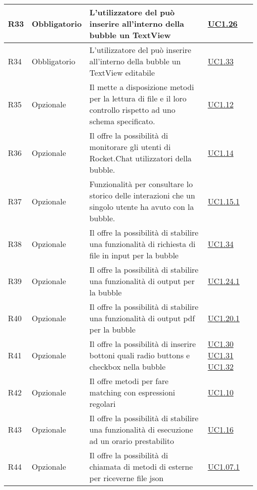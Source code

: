 \begin{longtable}{|P{1.5cm}|P{3cm}|P{6cm}|P{2.5cm}|}
	\hline R33 & Obbligatorio & L’utilizzatore del  può inserire all'interno della bubble un TextView & \hyperref[UC1.26]{UC1.26} \\
	\hline R34 & Obbligatorio & L’utilizzatore del  può inserire all'interno della bubble un TextView editabile & \hyperref[UC1.33]{UC1.33} \\
	\hline R35 & Opzionale & Il  mette a disposizione metodi per la lettura di file  e il loro controllo rispetto ad uno schema specificato. & \hyperref[UC1.12]{UC1.12} \\
	\hline R36 & Opzionale & Il  offre la possibilità di monitorare gli utenti di Rocket.Chat utilizzatori della bubble. & \hyperref[UC1.14]{UC1.14} \\
	\hline R37 & Opzionale & Funzionalità per consultare lo storico delle interazioni che un singolo utente ha avuto con la bubble. & \hyperref[UC1.15.1]{UC1.15.1} \\
	\hline R38 & Opzionale & Il  offre la possibilità di stabilire una funzionalità di richiesta di file in input per la bubble & \hyperref[UC1.34]{UC1.34} \\
	\hline R39 & Opzionale & Il  offre la possibilità di stabilire una funzionalità di output per la bubble & \hyperref[UC1.24.1]{UC1.24.1} \\
	\hline R40 & Opzionale & Il  offre la possibilità di stabilire una funzionalità di output pdf per la bubble & \hyperref[UC1.20.1]{UC1.20.1} \\	
	\hline R41 & Opzionale & Il  offre la possibilità di inserire bottoni quali radio buttons e checkbox nella bubble & \hyperref[UC1.30]{UC1.30} \linebreak \hyperref[UC1.31]{UC1.31} \linebreak \hyperref[UC1.32]{UC1.32} \\
	\hline R42 & Opzionale & Il  offre metodi per fare matching con espressioni regolari
	 & \hyperref[UC1.10]{UC1.10} \\
	\hline R43 & Opzionale & Il  offre la possibilità di stabilire una funzionalità di  esecuzione ad un orario prestabilito & \hyperref[UC1.16]{UC1.16} \\
	\hline R44 & Opzionale & Il  offre la possibilità di chiamata di metodi di  esterne per riceverne file json & \hyperref[UC1.07.1]{UC1.07.1} \\

\end{longtable}
